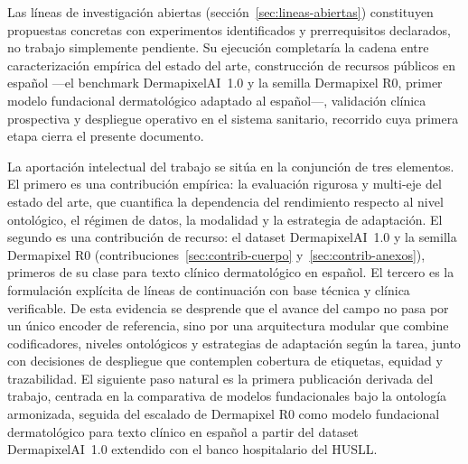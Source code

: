 Las líneas de investigación abiertas
(sección~\ref{sec:lineas-abiertas}) constituyen propuestas concretas con
experimentos identificados y prerrequisitos declarados, no trabajo
simplemente pendiente. Su ejecución completaría la cadena entre
caracterización empírica del estado del arte, construcción de
recursos públicos en español ---el benchmark DermapixelAI~1.0 y la
semilla Dermapixel R0, primer modelo fundacional dermatológico
adaptado al español---, validación clínica prospectiva y despliegue
operativo en el sistema sanitario, recorrido cuya primera etapa cierra
el presente documento.

La aportación intelectual del trabajo se sitúa en la conjunción de
tres elementos. El primero es una contribución empírica: la
evaluación rigurosa y multi-eje del estado del arte, que cuantifica
la dependencia del rendimiento respecto al nivel ontológico, el
régimen de datos, la modalidad y la estrategia de adaptación. El
segundo es una contribución de recurso: el dataset DermapixelAI~1.0
y la semilla Dermapixel R0
(contribuciones~\ref{sec:contrib-cuerpo}
y~\ref{sec:contrib-anexos}), primeros de su clase para texto
clínico dermatológico en español. El tercero es la formulación
explícita de líneas de continuación con base técnica y clínica
verificable. De esta evidencia se desprende que el avance del campo
no pasa por un único encoder de referencia, sino por una
arquitectura modular que combine codificadores, niveles ontológicos
y estrategias de adaptación según la tarea, junto con decisiones de
despliegue que contemplen cobertura de etiquetas, equidad y
trazabilidad. El siguiente paso natural es la primera publicación
derivada del trabajo, centrada en la comparativa de modelos
fundacionales bajo la ontología armonizada, seguida del escalado de
Dermapixel R0 como modelo fundacional dermatológico para texto
clínico en español a partir del dataset DermapixelAI~1.0 extendido
con el banco hospitalario del HUSLL.
